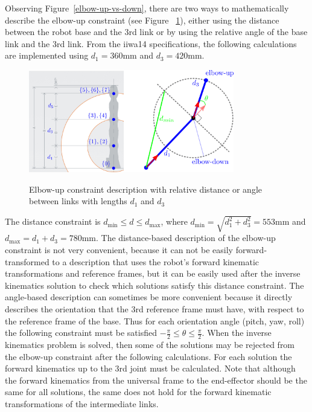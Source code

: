 Observing Figure~\ref{elbow-up-vs-down}, there are two ways to mathematically describe the elbow-up constraint (see Figure~ \ref{elbow-up-constraint-geometry}), either using the distance between the robot base and the 3rd link or by using the relative angle of the base link and the 3rd link. From the iiwa14 specifications, the following calculations are implemented using $d_1 = 360$mm and $d_3 = 420$mm.

\begin{figure}[htbp]
\centering
\includegraphics[width=0.8\textwidth]{images/elbow-up-constraint-geometry.png}\\
\caption{Elbow-up constraint description with relative distance or angle between links with lengths $d_1$ and $d_3$}
\label{elbow-up-constraint-geometry}
\end{figure}

The distance constraint is $d_{\min} \leq d \leq d_{\max}$,
where
$d_{\min} = \sqrt{d_1^2 + d_3^2} = 553$mm and $d_{\max} = d_1 + d_3 = 780\mbox{mm}.
$
The distance-based description of the elbow-up constraint is not very convenient, because it can not be easily forward-transformed to a description that uses the robot's forward kinematic transformations and reference frames, 
but it can be easily used after the inverse kinematics solution to check which solutions satisfy this distance constraint. 
The angle-based description can sometimes be more convenient because it directly describes the orientation that the 3rd reference frame must have, with respect to the reference frame of the base. Thus for each orientation 
angle (pitch, yaw, roll) the following constraint must be satisfied 
$-\frac{\pi}{2} \leq θ \leq \frac{\pi}{2}$.
When the inverse kinematics problem is solved, then some of the solutions may be rejected from the elbow-up constraint after the following calculations. For each solution the forward kinematics up to the 3rd joint must be 
calculated. Note that although the forward kinematics from the universal frame to the end-effector should be the same for all solutions, the same does not hold for the forward kinematic transformations of the intermediate 
links.

